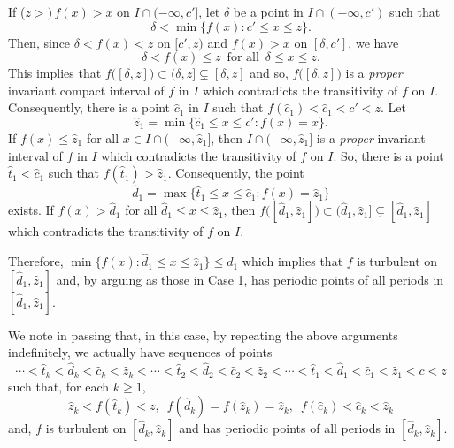 \documentclass[12pt]{article}
\begin{document}
If ($z >) \, f(x) > x$ on $I \cap (-\infty, c']$, let $\delta$ be a point in $I \cap (-\infty, c')$ such that $$\delta < \min \big\{ f(x) : c' \le x \le z \big\}.$$  Then, since $\delta < f(x) < z$ on $[c', z)$ and $f(x) > x$ on $[\delta, c']$, we have$$\delta < f(x) \le z \,\,\, \text{for all} \,\,\, \delta \le x \le z.$$ This implies that $f\bigl([\delta, z]\bigr) \subset (\delta, z] \subsetneq [\delta, z]$ and so, $f\bigl([\delta, z]\bigr)$ is a {\it proper} invariant compact interval of $f$ in $I$ which contradicts the transitivity of $f$ on $I$.  Consequently, there is a point $\hat c_1$ in $I$ such that $f(\hat c_1) < \hat c_1 < c' < z$.  Let $$\hat z_1 = \min \big\{ \hat c_1 \le x \le c' : f(x) = x \big\}.$$  If $f(x) \le \hat z_1$ for all $x \in I \cap (-\infty, \hat z_1]$, then $I \cap (-\infty, \hat z_1]$ is a {\it proper} invariant interval of $f$ in $I$ which contradicts the transitivity of $f$ on $I$.  So, there is a point $\hat t_1 < \hat c_1$ such that $f(\hat t_1) > \hat z_1$.  Consequently, the point $$\hat d_1 = \max \big\{ \hat t_1 \le x \le \hat c_1 : f(x) = \hat z_1 \big\}$$ exists.  If $f(x) > \hat d_1$ for all $\hat d_1 \le x \le \hat z_1$, then $f\bigl([\hat d_1, \hat z_1]\bigr) \subset (\hat d_1, \hat z_1] \subsetneq [\hat d_1, \hat z_1]$ which contradicts the transitivity of $f$ on $I$.  

Therefore, $\min \big\{ f(x): \hat d_1 \le x \le \hat z_1 \big\} \le d_1$ which implies that $f$ is turbulent on $[\hat d_1, \hat z_1]$ and, by arguing as those in Case 1, has periodic points of all periods in $[\hat d_1, \hat z_1]$.  

We note in passing that, in this case, by repeating the above arguments indefinitely, we actually have sequences of points $$\cdots < \hat t_k < \hat d_k < \hat c_k < \hat z_k < \cdots < \hat t_2 < \hat d_2 < \hat c_2 < \hat z_2 < \cdots < \hat t_1 < \hat d_1 < \hat c_1 < \hat z_1 < c < z$$such that, for each $k \ge 1$, $$\hat z_k < f(\hat t_k) < z, \,\,\, f(\hat d_k) = f(\hat z_k) = \hat z_k, \,\,\, f(\hat c_k) < \hat c_k < \hat z_k$$ and, $f$ is turbulent on $[\hat d_k, \hat z_k]$ and has periodic points of all periods in $[\hat d_k, \hat z_k]$. 
\end{document}
